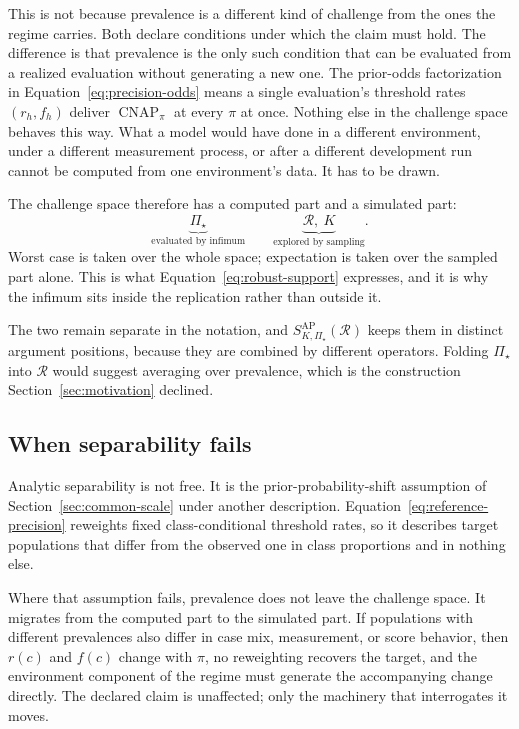 \documentclass[11pt]{article}
\newcommand{\CNAP}{\operatorname{CNAP}}
\newcommand{\Regime}{\mathcal{R}}
\newcommand{\PSet}{\Pi_\star}
\theoremstyle{remark}
\begin{document}
This is not because prevalence is a different kind of challenge from the ones the regime carries. Both declare conditions under which the claim must hold. The difference is that prevalence is the only such condition that can be evaluated from a realized evaluation without generating a new one. The prior-odds factorization in Equation~\eqref{eq:precision-odds} means a single evaluation's threshold rates $(r_h,f_h)$ deliver $\CNAP_\pi$ at every $\pi$ at once. Nothing else in the challenge space behaves this way. What a model would have done in a different environment, under a different measurement process, or after a different development run cannot be computed from one environment's data. It has to be drawn.

The challenge space therefore has a computed part and a simulated part:
\[
\underbrace{\PSet}_{\text{evaluated by infimum}}
\qquad
\underbrace{\Regime,\ K}_{\text{explored by sampling}}.
\]
Worst case is taken over the whole space; expectation is taken over the sampled part alone. This is what Equation~\eqref{eq:robust-support} expresses, and it is why the infimum sits inside the replication rather than outside it.

The two remain separate in the notation, and $S_{K,\PSet}^{\mathrm{AP}}(\Regime)$ keeps them in distinct argument positions, because they are combined by different operators. Folding $\PSet$ into $\Regime$ would suggest averaging over prevalence, which is the construction Section~\ref{sec:motivation} declined.

\subsection{When separability fails}

Analytic separability is not free. It is the prior-probability-shift assumption of Section~\ref{sec:common-scale} under another description. Equation~\eqref{eq:reference-precision} reweights fixed class-conditional threshold rates, so it describes target populations that differ from the observed one in class proportions and in nothing else.

Where that assumption fails, prevalence does not leave the challenge space. It migrates from the computed part to the simulated part. If populations with different prevalences also differ in case mix, measurement, or score behavior, then $r(c)$ and $f(c)$ change with $\pi$, no reweighting recovers the target, and the environment component of the regime must generate the accompanying change directly. The declared claim is unaffected; only the machinery that interrogates it moves.
\end{document}

